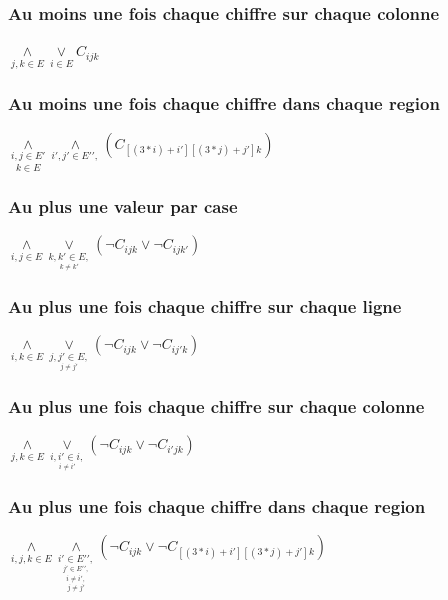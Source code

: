 \documentclass[12pt]{report}
\begin{document}
\subsubsection*{Au moins une fois chaque chiffre sur chaque colonne}
$\underset{j,k \in E}{\land} \underset{i \in E}{\lor} C_{ijk}$
\subsubsection*{Au moins une fois chaque chiffre dans chaque region}
$\underset{k \in E}{\underset{i,j \in E\prime}{\land}} \underset{i\prime,j\prime \in E\prime\prime,}{\land} (C_{[(3*i)+i\prime] [(3*j)+j\prime]k})$
\subsubsection*{Au plus une valeur par case}
$\underset{i,j \in E}{\land} \underset{\underset{k \ne k\prime}{k,k\prime \in E,} }{\lor} (\lnot C_{ijk} \lor \lnot C_{ijk\prime})$
\subsubsection*{Au plus une fois chaque chiffre sur chaque ligne}
$\underset{i,k \in E}{\land} \underset{\underset{j \ne j\prime}{j,j\prime \in E,}}{\lor} (\lnot C_{ijk} \lor \lnot C_{ij\prime k})$
\subsubsection*{Au plus une fois chaque chiffre sur chaque colonne}
$\underset{j,k \in E}{\land} \underset{\underset{i \ne i\prime}{i,i\prime \in i,}}{\lor} (\lnot C_{ijk} \lor \lnot C_{i\prime jk})$
\subsubsection*{Au plus une fois chaque chiffre dans chaque region}
$\underset{i,j,k \in E}{\land} \underset{\underset{j \neq j\prime}{\underset{i \neq i\prime,}{\underset{j\prime \in E\prime\prime,}{i\prime \in E\prime\prime,}}}}{\land} (\lnot C_{ijk} \lor \lnot C_{[(3*i)+i\prime] [(3*j)+j\prime]k})$
\end{document}
